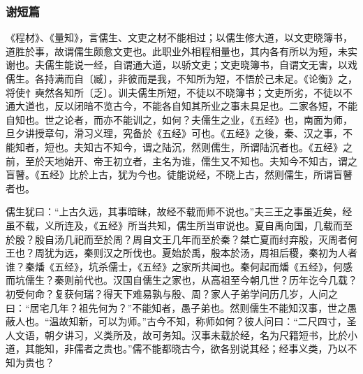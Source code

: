 \documentclass[]{article}
\begin{document}
\hypertarget{header-n544}{%
\subsubsection{谢短篇}\label{header-n544}}

《程材》、《量知》，言儒生、文吏之材不能相过；以儒生修大道，以文吏晓簿书，道胜於事，故谓儒生颇愈文吏也。此职业外相程相量也，其内各有所以为短，未实谢也。夫儒生能说一经，自谓通大道，以骄文吏；文吏晓簿书，自谓文无害，以戏儒生。各持满而自〔臧〕，非彼而是我，不知所为短，不悟於己未足。《论衡》之，将使忄奭然各知所〔乏〕。训夫儒生所短，不徒以不晓簿书；文吏所劣，不徒以不通大道也，反以闭暗不览古今，不能各自知其所业之事未具足也。二家各短，不能自知也。世之论者，而亦不能训之，如何？夫儒生之业，《五经》也，南面为师，旦夕讲授章句，滑习义理，究备於《五经》可也。《五经》之後，秦、汉之事，不能知者，短也。夫知古不知今，谓之陆沉，然则儒生，所谓陆沉者也。《五经》之前，至於天地始开、帝王初立者，主名为谁，儒生又不知也。夫知今不知古，谓之盲瞽。《五经》比於上古，犹为今也。徒能说经，不晓上古，然则儒生，所谓盲瞽者也。

儒生犹曰：``上古久远，其事暗昧，故经不载而师不说也。''夫三王之事虽近矣，经虽不载，义所连及，《五经》所当共知，儒生所当审说也。夏自禹向国，几载而至於殷？殷自汤几祀而至於周？周自文王几年而至於秦？桀亡夏而纣弃殷，灭周者何王也？周犹为远，秦则汉之所伐也。夏始於禹，殷本於汤，周祖后稷，秦初为人者谁？秦燔《五经》，坑杀儒士，《五经》之家所共闻也。秦何起而燔《五经》，何感而坑儒生？秦则前代也。汉国自儒生之家也，从高祖至今朝几世？历年讫今几载？初受何命？复获何瑞？得天下难易孰与殷、周？家人子弟学问历几岁，人问之曰：``居宅几年？祖先何为？''不能知者，愚子弟也。然则儒生不能知汉事，世之愚蔽人也。``温故知新，可以为师。''古今不知，称师如何？彼人问曰：``二尺四寸，圣人文语，朝夕讲习，义类所及，故可务知。汉事未载於经，名为尺籍短书，比於小道，其能知，非儒者之贵也。''儒不能都晓古今，欲各别说其经；经事义类，乃以不知为贵也？
\end{document}
